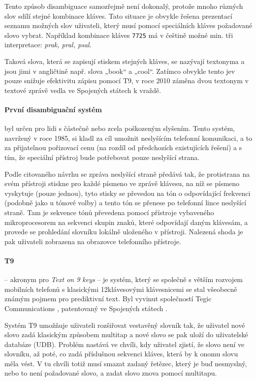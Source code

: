 \documentclass[a4paper,11pt]{article}
\begin{document}
Tento způsob disambiguace samozřejmě není dokonalý, protože mnoho různých slov sdílí stejné kombinace kláves. Tato situace je obvykle řešena prezentací seznamu možných slov uživateli, který musí pomocí speciálních kláves požadované slovo vybrat. \parencite{MacKenzie2001} Například kombinace kláves {\tt 7725} má v češtině možné min. tři interpretace: {\it prak, pral, psal}.

Taková slova, která se zapisují stiskem stejných kláves, se nazývají textonyma \parencite{ericzorn2007} a jsou jimi v angličtině např. slova „book“ a „cool“. Zatímco obvykle tento jev pouze snižuje efektivitu zápisu pomocí T9, v roce 2010 záměna dvou textonym v textové zprávě vedla ve Spojených státech k vraždě. \parencite{t9kill}

\paragraph{První disambiguační systém} byl určen pro lidi s částečně nebo zcela poškozeným slyšením. Tento systém, navržený v roce 1985, si kladl za cíl umožnit neslyšícím telefonní komunikaci, a to za přijatelnou pořizovací cenu (na rozdíl od předchozích existujících řešení) a s tím, že speciální přístroj bude potřebovat pouze neslyšící strana. \parencite{feinson1988interpretive}

Podle citovaného návrhu se zpráva neslyšící straně předává tak, že protistrana na svém přístroji stiskne pro každé písmeno ve zprávě klávesu, na níž se písmeno vyskytuje (pouze jednou), tyto stisky se převedou na tón o odpovídající frekvenci (podobně jako u tónové volby) a tento tón se přenese po telefonní lince neslyšící straně. Tam je sekvence tónů převedena pomocí přístroje vybaveného mikroprocesorem na sekvenci skupin znaků, které odpovídají daným klávesám, a provede se prohledání slovníku lokálně uloženého v přístroji. Nalezená shoda je pak uživateli zobrazena na obrazovce telefonního přístroje.

\paragraph{T9}\label{t9}
 -- akronym pro {\it Text on 9 keys} -- je systém, který se společně s větším rozvojem mobilních telefonů s klasickými 12klávesovými klávesnicemi se stal všeobecně známým pojmem pro prediktivní text. Byl vyvinut společností Tegic Communications \parencite{nuancecommunications2007}, patentovaný ve Spojených státech \parencite{grover1998reduced}. 

Systém T9 umožňuje uživateli rozšiřovat vestavěný slovník tak, že uživatel nové slovo zadá klasickým způsobem multitap a nové slovo se pak uloží do uživatelské databáze (UDB). \parencite{t9about} %
Problém nastává ve chvíli, kdy uživatel zjistí, že slovo není ve slovníku, až poté, co zadá příslušnou sekvenci kláves, která by k onomu slovu měla vést. V tu chvíli totiž musí smazat zadaný řetězec, který je buď nesmyslný, nebo to není požadované slovo, a zadat slovo znova pomocí multitapu.
\end{document}
